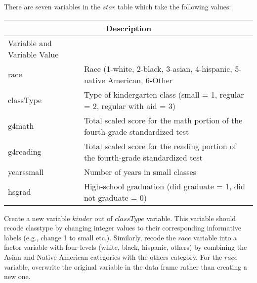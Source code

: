 \documentclass{article}\usepackage[]{graphicx}\usepackage[]{color}
\begin{document}
There are seven variables in the $star$ table which take the following values:

\begin{tabular}{ |p{3cm}|p{10cm}|  }
 \hline
 \multicolumn{2}{|c|}{Description} \\
 \hline
 Variable and Variable Value\\
 \hline
		race       & Race (1-white, 2-black, 3-asian, 4-hispanic, 5-native American, 6-Other \\
		classType  & Type of kindergarten class (small = 1, regular = 2, regular with aid = 3)\\ 
		g4math     & Total scaled score for the math portion of the fourth-grade standardized test \\
		g4reading  & Total scaled score for the reading portion of the fourth-grade standardized test \\
		yearssmall & Number of years in small classes\\
		hsgrad     & High-school graduation (did graduate = 1, did not graduate = 0)\\
\hline
\end{tabular}

Create a new variable $kinder$ out of $classType$ variable. This variable should recode classtype by changing integer values to their corresponding informative labels (e.g., change 1 to small etc.). Similarly, recode the $race$ variable into a factor variable with four levels (white, black, hispanic, others) by combining the Asian and Native American categories with the others category. For the $race$ variable, overwrite the original variable in the data frame rather than creating a new one.
\end{document}
